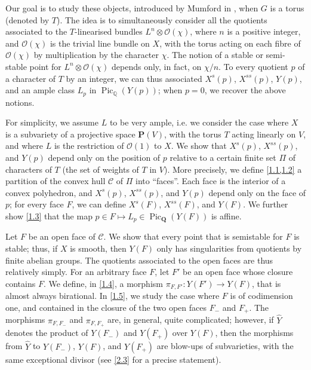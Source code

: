 \documentclass{article}
\newcommand{\sh}{\mathscr}
\newcommand{\PP}{\mathbf{P}}
\newcommand{\QQ}{\mathbf{Q}}
\DeclareMathOperator{\Pic}{Pic}
\newcommand{\oldpage}[1]{\marginpar{\footnotesize$\Big\vert$ \textit{p.~#1}}}
\begin{document}
Our goal is to study these objects, introduced by Mumford in \cite{MF}, when $G$ is a torus (denoted by $T$).
The idea is to simultaneously consider all the quotients associated to the $T$-linearised bundles $L^n\otimes\sh{O}(\chi)$, where $n$ is a positive integer, and $\sh{O}(\chi)$ is the trivial line bundle on $X$, with the torus acting on each fibre of $\sh{O}(\chi)$ by multiplication by the character $\chi$.
The notion of a stable or semi-stable point for $L^n\otimes\sh{O}(\chi)$ depends only, in fact, on $\chi/n$.
\oldpage{510}
To every quotient $p$ of a character of $T$ by an integer, we can thus associated $X^s(p)$, $X^{ss}(p)$, $Y(p)$, and an ample class $L_p$ in $\Pic_\mathbb{Q}(Y(p))$;
when $p=0$, we recover the above notions.

For simplicity, we assume $L$ to be very ample, i.e. we consider the case where $X$ is a subvariety of a projective space $\PP(V)$, with the torus $T$ acting linearly on $V$, and where $L$ is the restriction of $\sh{O}(1)$ to $X$.
We show that $X^s(p)$, $X^{ss}(p)$, and $Y(p)$ depend only on the position of $p$ relative to a certain finite set $\Pi$ of characters of $T$ (the set of weights of $T$ in $V$).
More precisely, we define \cref{1.1,1.2} a partition of the convex hull $\mathcal{C}$ of $\Pi$ into ``faces''.
Each face is the interior of a convex polyhedron, and $X^s(p)$, $X^{ss}(p)$, and $Y(p)$ depend only on the face of $p$;
for every face $F$, we can define $X^s(F)$, $X^{ss}(F)$, and $Y(F)$.
We further show \cref{1.3} that the map $p\in F\mapsto L_p\in\Pic_\QQ(Y(F))$ is affine.

Let $F$ be an open face of $\mathcal{C}$.
We show that every point that is semistable for $F$ is stable;
thus, if $X$ is smooth, then $Y(F)$ only has singularities from quotients by finite abelian groups.
The quotients associated to the open faces are thus relatively simply.
For an arbitrary face $F$, let $F'$ be an open face whose closure contains $F$.
We define, in \cref{1.4}, a morphism $\pi_{F,F'}\colon Y(F')\to Y(F)$, that is almost always birational.
In \cref{1.5}, we study the case where $F$ is of codimension one, and contained in the closure of the two open faces $F_-$ and $F_+$.
The morphisms $\pi_{F,F_-}$ and $\pi_{F,F_+}$ are, in general, quite complicated;
however, if $\hat{Y}$ denotes the product of $Y(F_-)$ and $Y(F_+)$ over $Y(F)$, then the morphisms from $\hat{Y}$ to $Y(F_-)$, $Y(F)$, and $Y(F_+)$ are blow-ups of subvarieties, with the same exceptional divisor (see \cref{2.3} for a precise statement).
\end{document}
